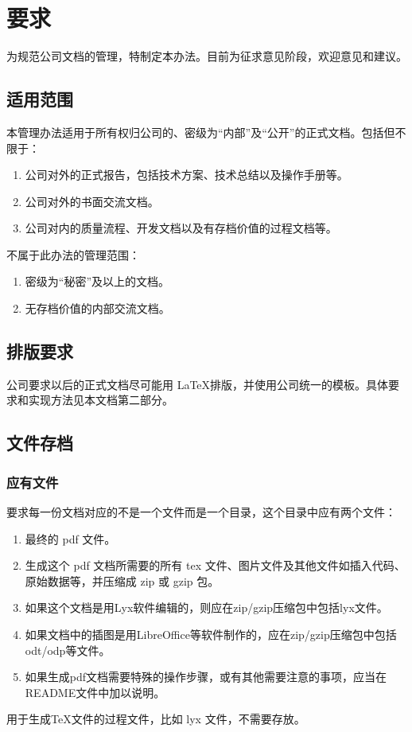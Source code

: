 \chapter{要求}

为规范公司文档的管理，特制定本办法。目前为征求意见阶段，欢迎意见和建议。
\section{适用范围}
本管理办法适用于所有权归公司的、密级为“内部”及“公开”的正式文档。包括但不限于：
\begin{enumerate}
\item 公司对外的正式报告，包括技术方案、技术总结以及操作手册等。
\item 公司对外的书面交流文档。
\item 公司对内的质量流程、开发文档以及有存档价值的过程文档等。
\end{enumerate}
不属于此办法的管理范围：
\begin{enumerate}
\item 密级为“秘密”及以上的文档。
\item 无存档价值的内部交流文档。
\end{enumerate}

\section{排版要求}
公司要求以后的正式文档尽可能用 \LaTeX 排版，并使用公司统一的模板。具体要求和实现方法见本文档第二部分。

\section{文件存档}

\subsection{应有文件}
要求每一份文档对应的不是一个文件而是一个目录，这个目录中应有两个文件：
\begin{enumerate}
\item 最终的 pdf 文件。
\item 生成这个 pdf 文档所需要的所有 tex 文件、图片文件及其他文件如插入代码、原始数据等，并压缩成 zip 或 gzip 包。
\item 如果这个文档是用Lyx软件编辑的，则应在zip/gzip压缩包中包括lyx文件。
\item 如果文档中的插图是用LibreOffice等软件制作的，应在zip/gzip压缩包中包括odt/odp等文件。
\item 如果生成pdf文档需要特殊的操作步骤，或有其他需要注意的事项，应当在README文件中加以说明。
\end{enumerate}
用于生成\TeX 文件的过程文件，比如 lyx 文件，不需要存放。
